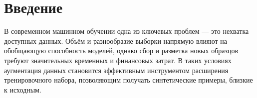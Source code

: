 



\section{Введение}

В современном машинном обучении одна из ключевых проблем — это нехватка доступных данных. Объём и разнообразие выборки напрямую влияют на обобщающую способность моделей, однако сбор и разметка новых образцов требуют значительных временных и финансовых затрат. В таких условиях аугментация данных становится эффективным инструментом расширения тренировочного набора, позволяющим получать синтетические примеры, близкие к исходным.

